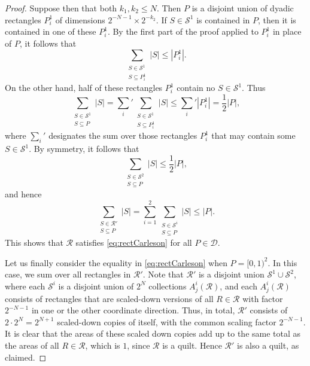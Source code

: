 \documentclass[11pt, reqno]{amsart}
\theoremstyle{definition}
\theoremstyle{remark}
\numberwithin{equation}{section}
\newcommand{\abs}[1]{|#1|}
\begin{document}
\begin{proof}
Suppose then that both $k_1,k_2\leq N$. Then $P$ is a disjoint union of dyadic rectangles $P^1_i$ of dimensions $2^{-N-1}\times 2^{-k_2}$. If $S\in\mathscr S^1$ is contained in $P$, then it is contained in one of these $P^1_i$. By the first part of the proof applied to $P^1_i$ in place of $P$, it follows that
\begin{equation*}
  \sum_{\substack{ S\in\mathscr S^1 \\ S\subseteq P^1_i}}\abs{S}\leq\abs{P^1_i}.
\end{equation*}
On the other hand, half of these rectangles $P^1_i$ contain no $S\in\mathscr S^1$. Thus
\begin{equation*}
  \sum_{\substack{ S\in\mathscr S^1 \\ S\subseteq P}}\abs{S}
  =\sum_i' \sum_{\substack{ S\in\mathscr S^1 \\ S\subseteq P_i^1}}\abs{S}
  \leq\sum_i'\abs{P^1_i}=\frac12\abs{P},
\end{equation*}
where $\sum_i'$ designates the sum over those rectangles $P_i^1$ that may contain some $S\in\mathscr S^1$. By symmetry, it follows that
\begin{equation*}
  \sum_{\substack{ S\in\mathscr S^2 \\ S\subseteq P}}\abs{S}\leq\frac12\abs{P},
\end{equation*}
and hence
\begin{equation*}
  \sum_{\substack{ S\in\mathscr R' \\ S\subseteq P}}\abs{S}
  =\sum_{i=1}^2 \sum_{\substack{ S\in\mathscr S^i \\ S\subseteq P}}\abs{S}
  \leq \abs{P}.
\end{equation*}
This shows that $\mathscr R$ satisfies \eqref{eq:rectCarleson} for all $P\in\mathscr D$.

Let us finally consider the equality in \eqref{eq:rectCarleson} when $P=[0,1)^2$. In this case, we sum over all rectangles in $\mathscr R'$. Note that $\mathscr R'$ is a disjoint union $\mathscr S^1\cup\mathscr S^2$, where each $\mathscr S^i$ is a disjoint union of $2^N$ collections $A^i_j(\mathscr R)$, and each $A^i_j(\mathscr R)$ consists of rectangles that are scaled-down versions of all $R\in\mathscr R$ with factor $2^{-N-1}$ in one or the other coordinate direction. Thus, in total, $\mathscr R'$ consists of $2\cdot 2^N=2^{N+1}$ scaled-down copies of itself, with the common scaling factor $2^{-N-1}$. It is clear that the areas of these scaled down copies add up to the same total as the areas of all $R\in\mathscr R$, which is $1$, since $\mathscr R$ is a quilt. Hence $\mathscr R'$ is also a quilt, as claimed.
\end{proof}
\end{document}

